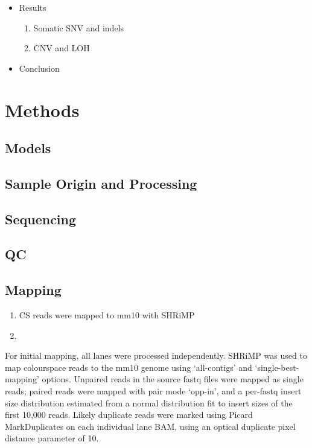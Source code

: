 \documentclass[thesis.tex]{subfiles}
\begin{document}
\begin{itemize}
  \item Results
  \begin{enumerate}
    \item Somatic SNV and indels
    \item CNV and LOH
  \end{enumerate}

  \item Conclusion
  
\end{itemize}

\section{Methods}

\subsection{Models}

\subsection{Sample Origin and Processing}

\subsection{Sequencing}

\subsection{QC}

\subsection{Mapping}

\begin{enumerate}
  \item CS reads were mapped to mm10 with SHRiMP
  \item 
\end{enumerate}

For initial mapping, all lanes were processed independently.  SHRiMP was used to map colourspace reads to the mm10 genome using `all-contigs' and `single-best-mapping' options.  Unpaired reads in the source fastq files were mapped as single reads; paired reads were mapped with pair mode `opp-in', and a per-fastq insert size distribution estimated from a normal distribution fit to insert sizes of the first 10,000 reads.  Likely duplicate reads were marked using Picard MarkDuplicates on each individual lane BAM, using an optical duplicate pixel distance parameter of 10.
\end{document}

